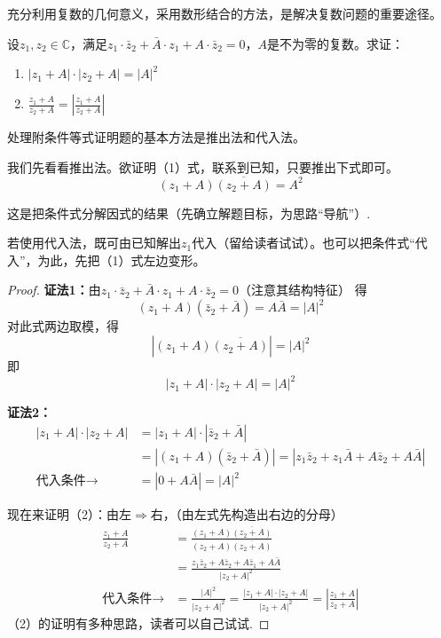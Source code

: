 \begin{rmk}
    充分利用复数的几何意义，采用数形结合的方法，是解决复数问题的重要途径。
\end{rmk}

\begin{example}
设$z_1,z_2\in\mathbb{C}$，满足$z_1\cdot \bar z_2+\bar A\cdot z_1+A\cdot \bar z_2=0$，$A$是不为零的复数。求证：
\begin{enumerate}
    \item $|z_1+A|\cdot |z_2+A|=|A|^2$
    \item $\frac{z_1+A}{z_2+A}=\left|\frac{z_1+A}{z_2+A}\right|$
\end{enumerate}
\end{example}

\begin{analyze}
    处理附条件等式证明题的基本方法是推出法和代入法。

我们先看看推出法。欲证明（1）式，联系到已知，只要推出下式即可。
\begin{equation}
    (z_1+A)\overline{(z_2+A)}=A^2 \tag{*}
\end{equation}

这是把条件式分解因式的结果（先确立解题目标，为思路“导航”）.

若使用代入法，既可由已知解出$z_1$代入（留给读者试试）。也可以把条件式“代入”，为此，先把（1）式左边变形。
\end{analyze}

\begin{proof}
    \textbf{证法1：}由$z_1\cdot \bar z_2+\bar A\cdot z_1+A\cdot \bar z_2=0$（注意其结构特征）
得
\[(z_1+A)(\bar z_2+\bar A)=A\bar A=|A|^2\]
对此式两边取模，得
\[|(z_1+A)\overline{(z_2+A)}|=|A|^2\]
即
\[|z_1+A|\cdot |z_2+A|=|A|^2\]

\textbf{证法2：}
\[\begin{split}
    |z_1+A|\cdot |z_2+A|&=|z_1+A|\cdot |\bar z_2+\bar A|\\
&=|(z_1+A)(\bar z_2+\bar A)|=|z_1\bar z_2+z_1\bar A+A\bar z_2+A\bar A|\\
\text{代入条件} \to &=|0+A\bar A|=|A|^2
\end{split}\]

现在来证明（2）：由左$\Rightarrow$右，（由左式先构造出右边的分母）
\[\begin{split}
\frac{z_1+A}{z_2+A}&=\frac{(z_1+A)\overline{(z_2+A)}}{(z_2+A)\overline{(z_2+A)}}\\
&=\frac{z_1\bar z_2+A\bar z_2+A\bar z_1+A\bar A}{|z_2+A|^2}\\
\text{代入条件} \to &=\frac{|A|^2}{|z_2+A|^2}=\frac{|z_1+A|\cdot |z_2+A|}{|z_2+A|^2}=\left|\frac{z_1+A}{z_2+A}\right|
\end{split}\]
（2）的证明有多种思路，读者可以自己试试.
\end{proof}

